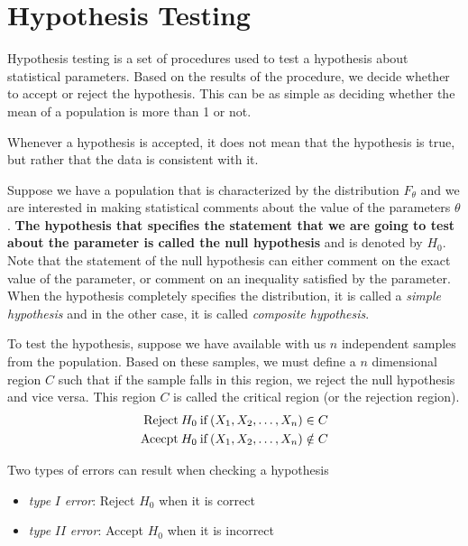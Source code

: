 \documentclass[../probability-notes.tex]{subfiles}
\begin{document}
    \chapter{Hypothesis Testing}
    Hypothesis testing is a set of procedures used to test a hypothesis about statistical parameters. Based on the results of the procedure, we decide whether to accept or reject the hypothesis. This can be as simple as deciding whether the mean of a population is more than 1 or not.\newline

    Whenever a hypothesis is accepted, it does not mean that the hypothesis is true, but rather that the data is consistent with it.\newline

    Suppose we have a population that is characterized by the distribution $F_{\theta}$ and we are interested in making statistical comments about the value of the parameters $\theta$. \textbf{The hypothesis that specifies the statement that we are going to test about the parameter is called the null hypothesis} and is denoted by $H_{0}$. Note that the statement of the null hypothesis can either comment on the exact value of the parameter, or comment on an inequality satisfied by the parameter. When the hypothesis completely specifies the distribution, it is called a \emph{simple hypothesis} and in the other case, it is called \emph{composite hypothesis}.\newline

    To test the hypothesis, suppose we have available with us $n$ independent samples from the population. Based on these samples, we must define a $n$ dimensional region $C$ such that if the sample falls in this region, we reject the null hypothesis and vice versa. This region $C$ is called the critical region (or the rejection region).
    \begin{align*}
        \text{Reject\:} H_{0} \text{\:if\:} (X_{1}, X_{2}, \ldots, X_{n}) \in C\\
        \text{Acecpt\:} H_{0} \text{\:if\:} (X_{1}, X_{2}, \ldots, X_{n}) \notin C
    \end{align*}

    Two types of errors can result when checking a hypothesis
    \begin{itemize}
        \item \emph{type} $I$ \emph{error}: Reject $H_{0}$ when it is correct
        \item \emph{type} $II$ \emph{error}: Accept $H_{0}$ when it is incorrect
    \end{itemize}
\end{document}
